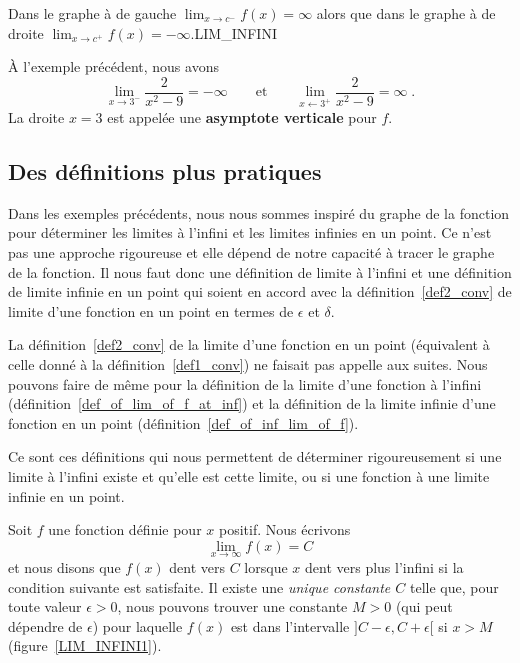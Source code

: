 {
{Dans le graphe à de gauche
$\displaystyle \lim_{x\rightarrow c^-} f(x) = \infty$
alors que dans le graphe à de droite 
$\displaystyle \lim_{x\rightarrow c^+} f(x) = -\infty$.}{LIM_INFINI}

\begin{egg}
À l'exemple précédent, nous avons
\[
\lim_{x\rightarrow 3^-} \frac{2}{x^2-9} = -\infty \qquad
\text{et} \qquad 
\lim_{x\leftarrow 3^+} \frac{2}{x^2-9} = \infty \; .
\]
La droite $x=3$ est appelée une {\bfseries asymptote verticale} pour $f$.
\end{egg}

\subsection{Des définitions plus pratiques \theory}

Dans les exemples précédents, nous nous sommes inspiré du graphe de la
fonction pour déterminer les limites à l'infini et les limites
infinies en un point.  Ce n'est pas une approche rigoureuse et elle
dépend de notre capacité à tracer le graphe de la fonction.  Il nous
faut donc une définition de limite à l'infini et une définition de
limite infinie en un point qui soient en accord avec la
définition~\ref{def2_conv} de limite d'une fonction en un point en
termes de $\epsilon$ et $\delta$.

La définition~\ref{def2_conv} de la limite d'une fonction en un point
(équivalent à celle donné à la définition~\ref{def1_conv}) ne faisait
pas appelle aux suites.  Nous pouvons faire de même pour la définition de la
limite d'une fonction à l'infini
(définition~\ref{def_of_lim_of_f_at_inf}) et la définition de la limite
infinie d'une fonction en un point (définition~\ref{def_of_inf_lim_of_f}).

Ce sont ces définitions qui nous permettent de déterminer
rigoureusement si une limite à l'infini existe et qu'elle est cette
limite, ou si une fonction à une limite infinie en un point.

\begin{defn} 
Soit $f$ une fonction définie pour $x$ positif.  Nous écrivons
\[
\lim_{x\rightarrow \infty} f(x) = C
\]
et nous disons que $f(x)$ dent vers $C$ lorsque $x$ dent vers plus l'infini
si la condition suivante est satisfaite.  Il existe une
{\em unique constante $C$} telle que, pour toute valeur $\epsilon>0$,
nous pouvons trouver une constante $M>0$ (qui peut dépendre de $\epsilon$)
pour laquelle $f(x)$ est dans l'intervalle $]C-\epsilon,C+\epsilon[$
si $x>M$ (figure~\ref{LIM_INFINI1}).


\end{defn}}
